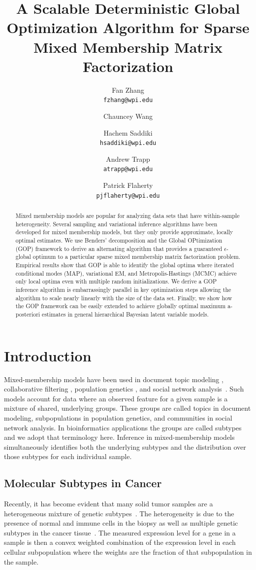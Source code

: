 \documentclass[11pt]{article}
\title{A Scalable Deterministic Global Optimization Algorithm for Sparse Mixed Membership Matrix Factorization}
\author{
  Fan Zhang\\
  \texttt{fzhang@wpi.edu}
  \and
  Chauncey Wang\\
  \texttt{}
  \and
  Hachem Saddiki\\
  \texttt{hsaddiki@wpi.edu}
  \and
  Andrew Trapp\\
  \texttt{atrapp@wpi.edu}
  \and
  Patrick Flaherty\\
  \texttt{pjflaherty@wpi.edu}
}
\begin{document}
\maketitle

\begin{abstract}
Mixed membership models are popular for analyzing data sets that have within-sample heterogeneity. 
Several sampling and variational inference algorithms have been developed for mixed membership models, but they only provide approximate, locally optimal estimates. 
We use Benders' decomposition and the Global OPtimization (GOP) framework to derive an alternating algorithm that provides a guaranteed $\epsilon$-global optimum to a particular sparse mixed membership matrix factorization problem. 
Empirical results show that GOP is able to identify the global optima where iterated conditional modes (MAP), variational EM, and Metropolis-Hastings (MCMC) achieve only local optima even with multiple random initializations.
We derive a GOP inference algorithm is embarrassingly parallel in key optimization steps allowing the algorithm to scale nearly linearly with the size of the data set.
Finally, we show how the GOP framework can be easily extended to achieve globally optimal maximum a-posteriori estimates in general hierarchical Bayesian latent variable models.
\end{abstract}

\section{Introduction}\label{sec:intro}

Mixed-membership models have been used in document topic modeling \cite{Blei2003a}, collaborative filtering \cite{Mackey2010}, population genetics \cite{Pritchard2000}, and social network analysis~\cite{Airoldi:2008wi}. 
Such models account for data where an observed feature for a given sample is a mixture of shared, underlying groups. 
These groups are called topics in document modeling, subpopulations in population genetics, and communities in social network analysis. 
In bioinformatics applications the groups are called subtypes and we adopt that terminology here. 
Inference in mixed-membership models simultaneously identifies both the underlying subtypes and the distribution over those subtypes for each individual sample.

\subsection{Molecular Subtypes in Cancer}
Recently, it has become evident that many solid tumor samples are a heterogeneous mixture of genetic subtypes~\cite{Gerlinger:2012fs}. 
The heterogeneity is due to the presence of normal and immune cells in the biopsy as well as multiple genetic subtypes in the cancer tissue~\cite{}. 
The measured expression level for a gene in a sample is then a convex weighted combination of the expression level in each cellular subpopulation where the weights are the fraction of that subpopulation in the sample.
\end{document}
